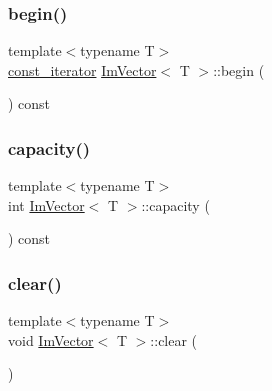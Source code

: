 \hypertarget{class_im_vector_ac72cd4105b5c6a7f76157df945b39d4c}{}\label{class_im_vector_ac72cd4105b5c6a7f76157df945b39d4c} 
\subsubsection{\texorpdfstring{begin()}{begin()}\hspace{0.1cm}{\footnotesize\ttfamily [2/2]}}
{\footnotesize\ttfamily template$<$typename T$>$ \\
\hyperlink{class_im_vector_aedeac9c5080f9d6ce96ae837768ee4c4}{const\+\_\+iterator} \hyperlink{class_im_vector}{Im\+Vector}$<$ T $>$\+::begin (\begin{DoxyParamCaption}{ }\end{DoxyParamCaption}) const}

\hypertarget{class_im_vector_ac17681baa8b9b5cd97e556da29f9ef73}{}\label{class_im_vector_ac17681baa8b9b5cd97e556da29f9ef73} 
\subsubsection{\texorpdfstring{capacity()}{capacity()}}
{\footnotesize\ttfamily template$<$typename T$>$ \\
int \hyperlink{class_im_vector}{Im\+Vector}$<$ T $>$\+::capacity (\begin{DoxyParamCaption}{ }\end{DoxyParamCaption}) const}

\hypertarget{class_im_vector_ae2d401b4ec5f1113cdb8edb5a61a38f7}{}\label{class_im_vector_ae2d401b4ec5f1113cdb8edb5a61a38f7} 
\subsubsection{\texorpdfstring{clear()}{clear()}}
{\footnotesize\ttfamily template$<$typename T$>$ \\
void \hyperlink{class_im_vector}{Im\+Vector}$<$ T $>$\+::clear (\begin{DoxyParamCaption}{ }\end{DoxyParamCaption})}

\hypertarget{class_im_vector_aa53e48a5272f4bad1099368769514ff1}{}\label{class_im_vector_aa53e48a5272f4bad1099368769514ff1} 
